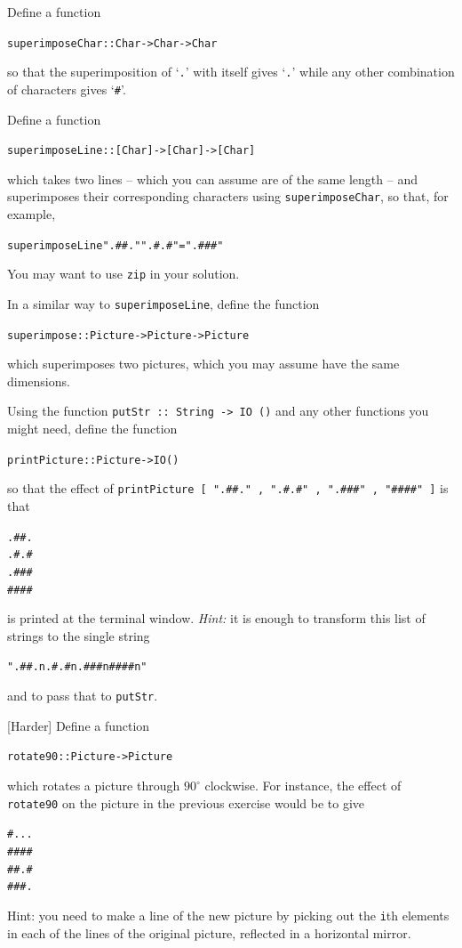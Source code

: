 \begin{exercises}


\item
Define a function
\begin{alltt}
superimposeChar :: Char -> Char -> Char
\end{alltt}
so that the superimposition of `\texttt{.}' with itself gives
`\texttt{.}' while any other combination of characters gives
`\texttt{\#}'.

\item
Define a function
\begin{alltt}
superimposeLine :: [Char] -> [Char] -> [Char]
\end{alltt}
which takes two lines -- which you can assume are of the same length --
and superimposes their corresponding characters using \texttt{superimposeChar}, so that, for example,
\begin{alltt}
superimposeLine ".##." ".#.#" = ".###"
\end{alltt}
You may want to use \texttt{zip} in your solution.

\item
In a similar way to \texttt{superimposeLine},
define the function
\begin{alltt}
superimpose :: Picture -> Picture -> Picture
\end{alltt}
which superimposes two pictures, which you may assume have the same
dimensions. 

\item
Using the function 
\texttt{putStr ::\ String -> IO ()}
and any other functions you might need, define the function 
\begin{alltt}
printPicture :: Picture -> IO ()
\end{alltt}
so that the effect of 
\texttt{printPicture [\,".\#\#."\,, ".\#.\#"\,, ".\#\#\#"\,, "\#\#\#\#"\,]}
is that
\begin{alltt}
.##.
.#.#
.###
####
\end{alltt}
is printed at the terminal window. \emph{Hint:} it is enough to transform this list of strings to the single string
\begin{alltt}
".\#\#.\bs{}n.\#.\#\bs{}n.\#\#\#\bs{}n\#\#\#\#\bs{}n"
\end{alltt}
and to pass that to \texttt{putStr}.


\item {[Harder]} 
Define a function
\begin{alltt}
rotate90 :: Picture -> Picture
\end{alltt}
which rotates a picture through $90^\circ$ clockwise. For
instance, the effect of \texttt{rotate90} on the picture in the previous exercise
would be to give
\begin{alltt}
#...
####
##.#
###.
\end{alltt} 
Hint: you need to make a line of the new picture by picking out the
\texttt{i}th elements in each of the lines of the original picture, reflected 
in a horizontal mirror. 


\end{exercises}
